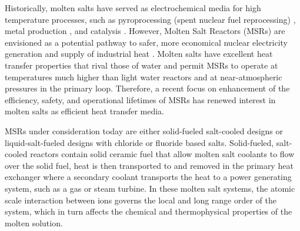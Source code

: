 \documentclass[review]{elsarticle}
\begin{document}
Historically, molten salts have served as electrochemical media for high temperature processes, such as pyroprocessing (spent nuclear fuel reprocessing) \cite{CHOI2015572, osti_22107867}, metal production \cite{Zhu2014, VAHIDI2018178}, and catalysis \cite{JIN20202382, HU20204244}. However, Molten Salt Reactors (MSRs) are envisioned as a potential pathway to safer, more economical nuclear electricity generation and supply of industrial heat \cite{ELSHEIKH201363, SINGH2017887}. Molten salts have excellent heat transfer properties that rival those of water and permit MSRs to operate at temperatures much higher than light water reactors and at near-atmospheric pressures in the primary loop. Therefore, a recent focus on enhancement of the efficiency, safety, and operational lifetimes of MSRs has renewed interest in molten salts as efficient heat transfer media.

MSRs under consideration today are either solid-fueled salt-cooled designs \cite{doi:10.13182/NSE90-374} or liquid-salt-fueled designs \cite{doi:10.1080/00295450.2019.1586372} with chloride or fluoride based salts. Solid-fueled, salt-cooled reactors contain solid ceramic fuel that allow molten salt coolants to flow over the solid fuel, heat is then transported to and removed in the primary heat exchanger where a secondary coolant transports the heat to a power generating system, such as a gas or steam turbine. In these molten salt systems, the atomic scale interaction between ions governs the local and long range order of the system, which in turn affects the chemical and thermophysical properties of the molten solution.
\end{document}
